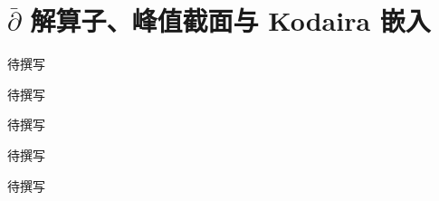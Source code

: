 
% 
% 

\chapter{\texorpdfstring{\(\bar{\partial}\)}{\={∂}} 解算子、峰值截面与 Kodaira 嵌入}
\label{g4:ch:19}

\begin{chapterabstract}
待撰写
\end{chapterabstract}

\begin{learninggoals}
待撰写
\end{learninggoals}

待撰写







\begin{chaptersummary}
待撰写
\end{chaptersummary}

\BookExercises
待撰写
